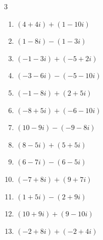 \begin{multicols}{3}
\begin{enumerate}
        \phantom{$\displaystyle =13$}

  \item $\displaystyle (4+4i) + (1-10i)$

        \phantom{$\displaystyle =5-6i$}

  \item $\displaystyle (1-8i) - (1-3i)$

        \phantom{$\displaystyle =-5i$}

  \item $\displaystyle (-1-3i) + (-5+2i)$

        \phantom{$\displaystyle =-6-i$}

  \item $\displaystyle (-3-6i) - (-5-10i)$

        \phantom{$\displaystyle =2+4i$}

  \item $\displaystyle (-1-8i) + (2+5i)$

        \phantom{$\displaystyle =1-3i$}

  \item $\displaystyle (-8+5i) + (-6-10i)$

        \phantom{$\displaystyle =-14-5i$}

  \item $\displaystyle (10-9i) - (-9-8i)$

        \phantom{$\displaystyle =19-i$}

  \item $\displaystyle (8-5i) + (5+5i)$

        \phantom{$\displaystyle =13$}

\columnbreak %

  \item $\displaystyle (6-7i) - (6-5i)$

        \phantom{$\displaystyle =-2i$}

  \item $\displaystyle (-7+8i) + (9+7i)$

        \phantom{$\displaystyle =2+15i$}

  \item $\displaystyle (1+5i) - (2+9i)$

        \phantom{$\displaystyle =-1-4i$}

  \item $\displaystyle (10+9i) + (9-10i)$

        \phantom{$\displaystyle =19-i$}

  \item $\displaystyle (-2+8i) + (-2+4i)$


\end{enumerate}
\end{multicols}
